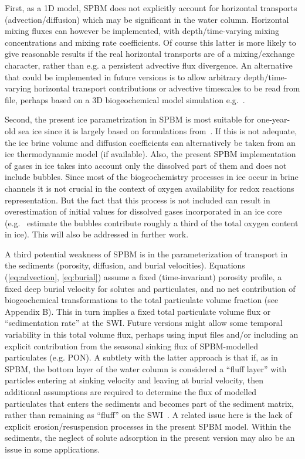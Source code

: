 \documentclass[gmd, manuscript]{copernicus}
\begin{document}
First, as a 1D model, \textrm{SPBM} does not explicitly account for horizontal transports (advection/diffusion) which may be significant in the water column.
Horizontal mixing fluxes can however be implemented, with depth/time-varying mixing concentrations and mixing rate coefficients.
Of course this latter is more likely to give reasonable results if the real horizontal transports are of a mixing/exchange character, rather than e.g. a persistent advective flux divergence.
An alternative that could be implemented in future versions is to allow arbitrary depth/time-varying horizontal transport contributions or advective timescales to be read from file, perhaps based on a 3D biogeochemical model simulation e.g.~\citet{Friedrichs2007}.

Second, the present ice parametrization in \textrm{SPBM} is most suitable for one-year-old sea ice since it is largely based on formulations from~\citet{Arrigo1993}.
If this is not adequate, the ice brine volume and diffusion coefficients can alternatively be taken from an ice thermodynamic model (if available).
Also, the present \textrm{SPBM} implementation of gases in ice takes into account only the dissolved part of them and does not include bubbles.
Since most of the biogeochemistry processes in ice occur in brine channels it is not crucial in the context of oxygen availability for redox reactions representation.
But the fact that this process is not included can result in overestimation of initial values for dissolved gases incorporated in an ice core (e.g.~\citet{Rysgaard2004} estimate the bubbles contribute roughly a third of the total oxygen content in ice).
This will also be addressed in further work.

A third potential weakness of \textrm{SPBM} is in the parameterization of transport in the sediments (porosity, diffusion, and burial velocities).
Equations (\ref{eq:advection}, \ref{eq:burial}) assume a fixed (time-invariant) porosity profile, a fixed deep burial velocity for solutes and particulates, and no net contribution of biogeochemical transformations to the total particulate volume fraction (see~\citet{Yakushev2017} Appendix B).
This in turn implies a fixed total particulate volume flux or “sedimentation rate” at the \textrm{SWI}.
Future versions might allow some temporal variability in this total volume flux, perhaps using input files and/or including an explicit contribution from the seasonal sinking flux of \textrm{SPBM}-modelled particulates (e.g. \textrm{PON}).
A subtlety with the latter approach is that if, as in \textrm{SPBM}, the bottom layer of the water column is considered a “fluff layer” with particles entering at sinking velocity and leaving at burial velocity, then additional assumptions are required to determine the flux of modelled particulates that enters the sediments and becomes part of the sediment matrix, rather than remaining as “fluff” on the \textrm{SWI}~\citep{Yakushev2017}.
A related issue here is the lack of explicit erosion/resuspension processes in the present \textrm{SPBM} model.
Within the sediments, the neglect of solute adsorption in the present version may also be an issue in some applications.
\end{document}

